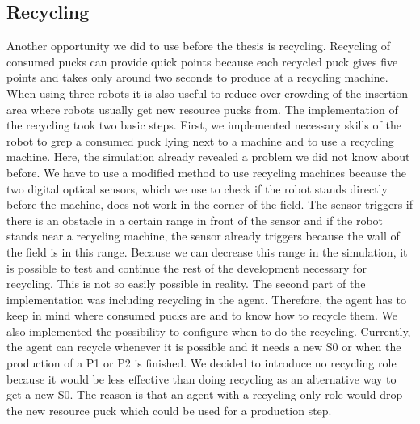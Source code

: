 \subsection{Recycling}
Another opportunity we did to use before the thesis is recycling. Recycling of consumed pucks can provide quick points because each recycled puck gives five points and takes only around two seconds to produce at a recycling machine. When using three robots it is also useful to reduce over-crowding of the insertion area where robots usually get new resource pucks from. The implementation of the recycling took two basic steps. First, we implemented necessary skills of the robot to grep a consumed puck lying next to a machine and to use a recycling machine. Here, the simulation already revealed a problem we did not know about before. We have to use a modified method to use recycling machines because the two digital optical sensors, which we use to check if the robot stands directly before the machine, does not work in the corner of the field. The sensor triggers if there is an obstacle in a certain range in front of the sensor and if the robot stands near a recycling machine, the sensor already triggers because the wall of the field is in this range. Because we can decrease this range in the simulation, it is possible to test and continue the rest of the development necessary for recycling. This is not so easily possible in reality. The second part of the implementation was including recycling in the agent. Therefore, the agent has to keep in mind where consumed pucks are and to know how to recycle them. We also implemented the possibility to configure when to do the recycling. Currently, the agent can recycle whenever it is possible and it needs a new S0 or when the production of a P1 or P2 is finished. We decided to introduce no recycling role because it would be less effective than doing recycling as an alternative way to get a new S0. The reason is that an agent with a recycling-only role would drop the new resource puck which could be used for a production step.

